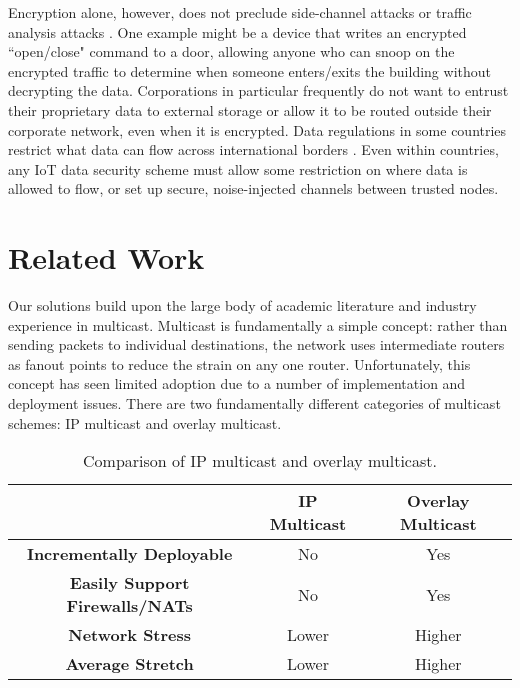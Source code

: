 Encryption alone, however, does not preclude side-channel attacks or traffic analysis attacks \cite{sidechannel}.  One example might be a device that writes an encrypted ``open/close" command to a door, allowing anyone who can snoop on the encrypted traffic to determine when someone enters/exits the building without decrypting the data.  Corporations in particular frequently do not want to entrust their proprietary data to external storage or allow it to be routed outside their corporate network, even when it is encrypted.  Data regulations in some countries restrict what data can flow across international borders \cite{itif}. Even within countries, any IoT data security scheme must allow some restriction on where data is allowed to flow, or set up secure, noise-injected channels between trusted nodes.

\section{Related Work}

Our solutions build upon the large body of academic literature and industry experience in multicast. Multicast is fundamentally a simple concept: rather than sending packets to individual destinations, the network uses intermediate routers as fanout points to reduce the strain on any one router. Unfortunately, this concept has seen limited adoption due to a number of implementation and deployment issues. There are two fundamentally different categories of multicast schemes: IP multicast and overlay multicast.

\begin{table}
	\begin{center}
		\begin{tabular}{|c|c|c|}
			\hline
			 & \textbf{IP Multicast} & \textbf{Overlay Multicast} \\
			\hline
			\textbf{Incrementally Deployable} & No & Yes \\
			\hline
			\textbf{Easily Support Firewalls/NATs} & No & Yes \\
			\hline
			\textbf{Network Stress} & Lower & Higher \\
			\hline
			\textbf{Average Stretch} & Lower & Higher \\
			\hline
		\end{tabular}
	\end{center}
	\caption{Comparison of IP multicast and overlay multicast.}
\end{table}


